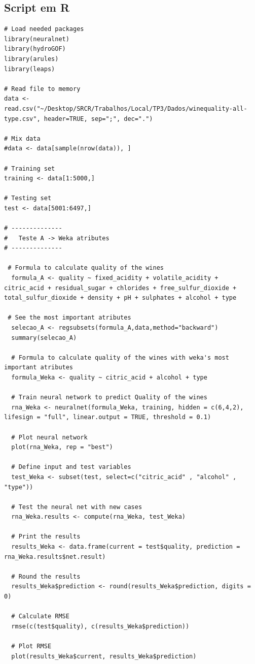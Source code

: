 \documentclass{report}
\begin{document}
\subsection{Script em R}
\begin{verbatim}
# Load needed packages
library(neuralnet)
library(hydroGOF)
library(arules)
library(leaps)

# Read file to memory
data <- read.csv("~/Desktop/SRCR/Trabalhos/Local/TP3/Dados/winequality-all-type.csv", header=TRUE, sep=";", dec=".")

# Mix data
#data <- data[sample(nrow(data)), ]

# Training set
training <- data[1:5000,]

# Testing set
test <- data[5001:6497,]

# --------------
#	Teste A	-> Weka atributes	
# --------------

 # Formula to calculate quality of the wines
  formula_A <- quality ~ fixed_acidity + volatile_acidity + citric_acid + residual_sugar + chlorides + free_sulfur_dioxide + total_sulfur_dioxide + density + pH + sulphates + alcohol + type
 
 # See the most important atributes
  selecao_A <- regsubsets(formula_A,data,method="backward")
  summary(selecao_A)
  
  # Formula to calculate quality of the wines with weka's most important atributes
  formula_Weka <- quality ~ citric_acid + alcohol + type
  
  # Train neural network to predict Quality of the wines
  rna_Weka <- neuralnet(formula_Weka, training, hidden = c(6,4,2), lifesign = "full", linear.output = TRUE, threshold = 0.1)
  
  # Plot neural network
  plot(rna_Weka, rep = "best")
  
  # Define input and test variables
  test_Weka <- subset(test, select=c("citric_acid" , "alcohol" , "type"))
  
  # Test the neural net with new cases
  rna_Weka.results <- compute(rna_Weka, test_Weka)
  
  # Print the results
  results_Weka <- data.frame(current = test$quality, prediction = rna_Weka.results$net.result)
  
  # Round the results
  results_Weka$prediction <- round(results_Weka$prediction, digits = 0)
  
  # Calculate RMSE
  rmse(c(test$quality), c(results_Weka$prediction))
  
  # Plot RMSE
  plot(results_Weka$current, results_Weka$prediction)
  


\end{verbatim}
\end{document}
